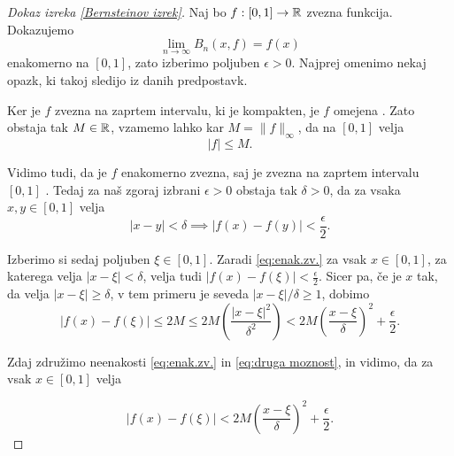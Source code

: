 \documentclass[a4paper, reqno]{amsart}
\theoremstyle{theorem}
\theoremstyle{definition}
\begin{document}
\begin{proof}[Dokaz \emph{izreka \ref{Bernsteinov izrek}}]

\par
Naj bo $f : [0,1] \to \mathbb{R}$ zvezna funkcija. Dokazujemo 
$$\lim_{n\to\infty}B_n(x, f) = f(x)$$
enakomerno na $[0,1]$, zato izberimo poljuben $\epsilon > 0$. Najprej
omenimo nekaj opazk, ki takoj sledijo iz danih predpostavk.

\par
Ker je $f$ zvezna na zaprtem intervalu, ki je kompakten, je $f$ omejena \cite[Izrek 30]{Ana1Skripta}.
Zato obstaja tak $M \in \mathbb{R}$, vzamemo lahko kar $M = \|f\|_{\infty}$, da na $[0,1]$ velja
$$ |f| \leq M \text{.}$$
\par
Vidimo tudi, da je $f$ enakomerno zvezna, saj je zvezna na zaprtem intervalu $[0,1]$ 
\cite[Izrek 28]{Ana1Skripta}.
Tedaj za naš zgoraj izbrani $\epsilon > 0$ obstaja tak $\delta > 0$, da za vsaka 
$x, y \in [0,1]$ velja
\begin{equation}
	\label{eq:enak.zv.}
	|x - y| < \delta \implies |f(x) - f(y)| < \frac{\epsilon}{2}\text{.}
\end{equation}

\par
Izberimo si sedaj poljuben $\xi \in [0,1]$. Zaradi \eqref{eq:enak.zv.} za vsak
$x \in [0,1]$, za katerega velja $|x - \xi| < \delta$, velja tudi 
$|f(x) - f(\xi)| < \frac{\epsilon}{2}$. Sicer pa, če je $x$ tak, da velja
$|x - \xi| \geq \delta$, v tem primeru je seveda $|x - \xi|/\delta \geq 1$, dobimo
\begin{equation}
	\label{eq:druga moznost}
	|f(x) - f(\xi)| \leq 2M \leq 2M\left(\frac{|x - \xi|^2}{\delta^2}\right) <
	2M\left(\frac{x - \xi}{\delta}\right)^2 + \frac{\epsilon}{2}\text{.}
\end{equation}

\noindent
Zdaj združimo neenakosti \eqref{eq:enak.zv.} in \eqref{eq:druga moznost},
in vidimo, da za vsak $x \in [0,1]$ velja

\begin{equation}
	\label{eq:f neenakost}
	|f(x) - f(\xi)| < 2M\left( \frac{x - \xi}{\delta}\right)^2 + \frac{\epsilon}{2}\text{.}
\end{equation}


\end{proof}
\end{document}
